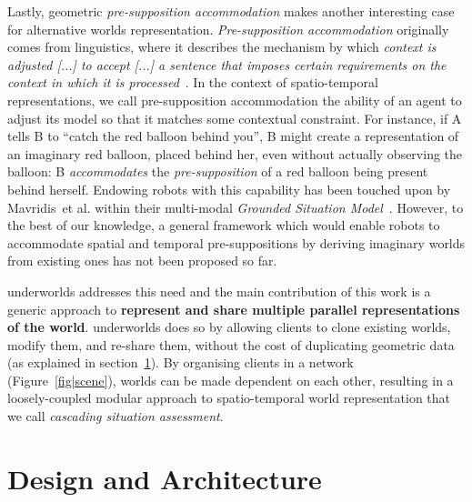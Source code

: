 \documentclass[letterpaper, 10pt, conference]{ieeeconf}
\newcommand{\etal}{et al.\xspace}
\newcommand{\uwds}{{\sc underworlds}\xspace}
\begin{document}
Lastly, geometric \emph{pre-supposition accommodation} makes another interesting
case for alternative worlds representation. \emph{Pre-supposition accommodation}
originally comes from linguistics, where it describes the mechanism by which
\emph{context is adjusted [...] to accept [...] a sentence that imposes certain
requirements on the context in which it is
processed}~\cite{vonfintel2008presupposition}. In the context of spatio-temporal
representations, we call pre-supposition accommodation the ability of an agent
to adjust its model so that it matches some contextual constraint. For instance,
if A tells B to ``catch the red balloon behind you'', B might create a
representation of an imaginary red balloon, placed behind her, even without
actually observing the balloon: B \emph{accommodates} the \emph{pre-supposition}
of a red balloon being present behind herself. Endowing robots with this
capability has been touched upon by Mavridis~\etal within their multi-modal
\emph{Grounded Situation Model}~\cite{Mavridis2006}. However, to the best of our
knowledge, a general framework which would enable robots to accommodate spatial
and temporal pre-suppositions by deriving imaginary worlds from existing ones
has not been proposed so far.

\uwds addresses this need and the main contribution of this work is a generic
approach to \textbf{represent and share multiple parallel representations of the
world}. \uwds does so by allowing clients to clone existing worlds, modify
them, and re-share them, without the cost of duplicating geometric data (as
explained in section~\ref{design}). By organising clients in a network
(Figure~\ref{fig|scene}), worlds can be made dependent on each other, resulting
in a loosely-coupled modular approach to spatio-temporal world representation
that we call \emph{cascading situation assessment}.


\section{Design and Architecture}
\label{design}
\end{document}
